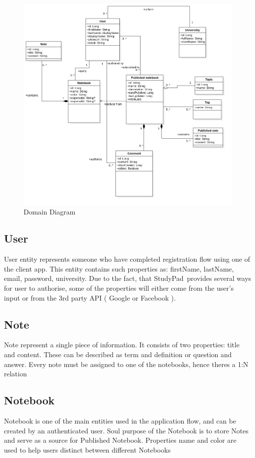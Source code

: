\documentclass[thesis=B,english]{FITthesis}[2012/10/20]
\newcommand{\appname}{StudyPad}
\begin{document}
\begin{figure}[H]
  \includegraphics[width=\linewidth]{Domain}
  \caption{Domain Diagram}
  \label{fig:domain}
\end{figure}

 

\subsection{User}
	User entity represents someone who have completed registration flow using one of the client app. This entity contains such properties as: firstName, lastName, email, password, university. Due to the fact, that \appname\ provides several ways for user to authorise, some of the properties will either come from the user's input or from the 3rd party API ( Google or Facebook ).

	
\subsection{Note}
	Note represent a single piece of information. It consists of two properties: title and content. These can be described as term and definition or question and answer. Every note must be assigned to one of the notebooks, hence theres a 1:N relation
\subsection{Notebook}
	Notebook is one of the main entities used in the application flow, and  can be created by an authenticated user. Soul purpose of the Notebook is to store Notes and serve as a source for Published Notebook. Properties name and color are used to help users distinct between different Notebooks
	
\end{document}
